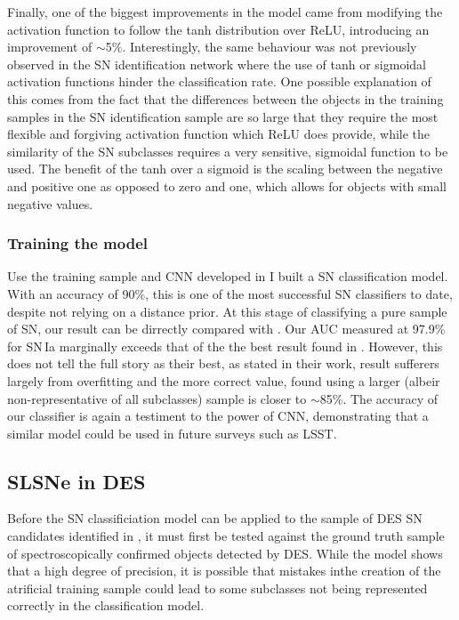Finally, one of the biggest improvements in the model came from modifying the activation function to follow the tanh distribution over ReLU, introducing an improvement of $\sim$5\%. Interestingly, the same behaviour was not previously observed in the SN identification network where the use of tanh or sigmoidal activation functions hinder the classification rate. One possible explanation of this comes from the fact that the differences between the objects in the training samples in the SN identification sample are so large that they require the most flexible and forgiving activation function which ReLU does provide, while the similarity of the SN subclasses requires a very sensitive, sigmoidal function to be used. The benefit of the tanh over a sigmoid is the scaling between the negative and positive one as opposed to zero and one, which allows for objects with small negative values.

\subsubsection{Training the model} \label{sec:SNClassification}
 Use the training sample and CNN developed in  I built a SN classification model. With an accuracy of 90\%, this is one of the most successful SN classifiers to date, despite not relying on a distance prior. At this stage of classifying a pure sample of SN, our result can be dirrectly compared with \citet{Lochner2016}. Our AUC measured at 97.9\% for SN\,Ia marginally exceeds that of the the best result found in \citet{Lochner2016}. However, this does not tell the full story as their best, as stated in their work, result sufferers largely from overfitting and the more correct value, found using a larger (albeir non-representative of all subclasses) sample is closer to $\sim$85\%. The accuracy of our classifier is again a testiment to the power of CNN, demonstrating that a similar model could be used in future surveys such as LSST.

\begin{figure}
  \caption{}
  \label{sec:SNClassificationROC}
\end{figure}

\subsection{SLSNe in DES}
Before the SN classificiation model can be applied to the sample of DES SN candidates identified in , it must first be tested against the ground truth sample of spectroscopically confirmed objects detected by DES. While the model shows that a high degree of precision, it is possible that mistakes inthe creation of the atrificial training sample could lead to some subclasses not being represented correctly in the classification model.

